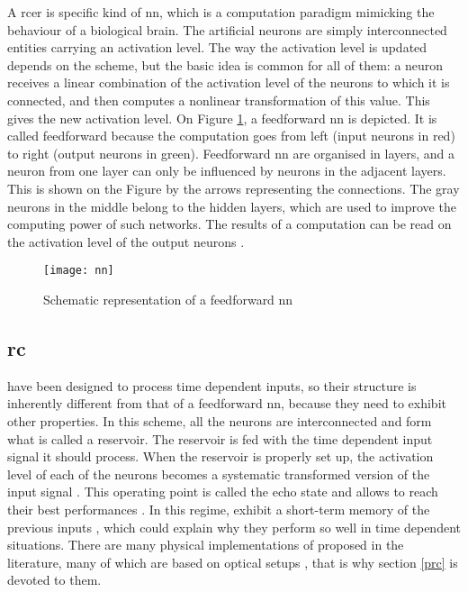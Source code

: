 A \gls{rcer} is specific kind of \gls{nn}, which is a computation paradigm mimicking the behaviour of a biological brain. The artificial neurons are simply interconnected entities carrying an activation level. The way the activation level is updated depends on the scheme, but the basic idea is common for all of them: a neuron receives a linear combination of the activation level of the neurons to which it is connected, and then computes a nonlinear transformation of this value. This gives the new activation level. On Figure \ref{nn}, a feedforward \gls{nn} is depicted. It is called feedforward because the computation goes from left (input neurons in red) to right (output neurons in green). Feedforward \gls{nn} are organised in layers, and a neuron from one layer can only be influenced by neurons in the adjacent layers. This is shown on the Figure by the arrows representing the connections. The gray neurons in the middle belong to the hidden layers, which are used to improve the computing power of such networks. The results of a computation can be read on the activation level of the output neurons \cite[p.727]{russell2010artificial}\cite[p.225]{bishop2006pattern}.

\begin{figure}[h]
	\centering
	\texttt{[image: nn]}
	\caption{Schematic representation of a feedforward \gls{nn}}
	\label{nn}
\end{figure}


\subsection{\acrlong{rc}}

\rcer have been designed to process time dependent inputs, so their structure is inherently different from that of a feedforward \gls{nn}, because they need to exhibit other properties. In this scheme, all the neurons are interconnected and form what is called a reservoir. The reservoir is fed with the time dependent input signal it should process. When the reservoir is properly set up, the activation level of each of the neurons becomes a systematic transformed version of the input signal \cite{Jaeger2004}. This operating point is called the echo state and allows \rcer to reach their best performances \cite{Goudarzi2014ACS, JaegerH.2001Tesa}. In this regime, \rcer exhibit a short-term memory of the previous inputs \cite{Jaeger2004}, which could explain why they perform so well in time dependent situations. There are many physical implementations of \rcer proposed in the literature, many of which are based on optical setups \cite{VanderSande2017}, that is why section \ref{prc} is devoted to them.\\

